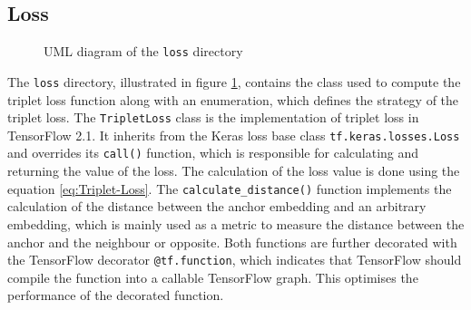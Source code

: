 \subsection{Loss}
\label{sub:Component-Loss}
\begin{figure}[htbp]
	\centering
	\caption{UML diagram of the \texttt{loss} directory}
	\label{fig:UML-Loss}
\end{figure}
\noindent
The \texttt{loss} directory, illustrated in figure \ref{fig:UML-Loss}, contains the class used to compute the triplet loss function along with an enumeration, which defines the strategy of the triplet loss. The \texttt{TripletLoss} class is the implementation of triplet loss in TensorFlow 2.1. It inherits from the Keras loss base class \texttt{tf.keras.losses.Loss} and overrides its \texttt{call()} function, which is responsible for calculating and returning the value of the loss. The calculation of the loss value is done using the equation \ref{eq:Triplet-Loss}. The \texttt{calculate\_distance()} function implements the calculation of the distance between the anchor embedding and an arbitrary embedding, which is mainly used as a metric to measure the distance between the anchor and the neighbour or opposite. Both functions are further decorated with the TensorFlow decorator \texttt{@tf.function}, which indicates that TensorFlow should compile the function into a callable TensorFlow graph. This optimises the performance of the decorated function.
